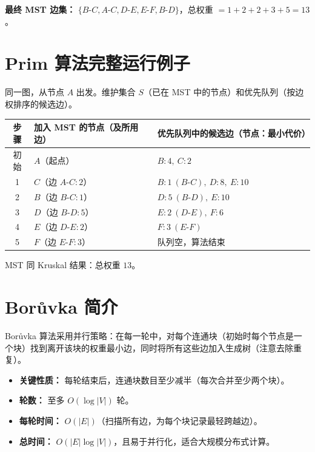 \documentclass[UTF8,openany,12pt]{ctexbook}
\theoremstyle{remark}
\begin{document}
\textbf{最终 MST 边集：} $\{B\text{-}C, A\text{-}C, D\text{-}E, E\text{-}F, B\text{-}D\}$，总权重 $= 1+2+2+3+5 = 13$。

\section{Prim 算法完整运行例子}

同一图，从节点 $A$ 出发。维护集合 $S$（已在 MST 中的节点）和优先队列（按边权排序的候选边）。

\begin{center}
\begin{tabular}{@{}cll@{}}
\toprule
步骤 & 加入 MST 的节点（及所用边） & 优先队列中的候选边（节点：最小代价） \\
\midrule
初始 & $A$（起点） & $B:4,\ C:2$ \\
1    & $C$（边 $A\text{-}C:2$） & $B:1\ (B\text{-}C),\ D:8,\ E:10$ \\
2    & $B$（边 $B\text{-}C:1$） & $D:5\ (B\text{-}D),\ E:10$ \\
3    & $D$（边 $B\text{-}D:5$） & $E:2\ (D\text{-}E),\ F:6$ \\
4    & $E$（边 $D\text{-}E:2$） & $F:3\ (E\text{-}F)$ \\
5    & $F$（边 $E\text{-}F:3$） & 队列空，算法结束 \\
\bottomrule
\end{tabular}
\end{center}

MST 同 Kruskal 结果：总权重 $13$。

\section{Bor\r{u}vka 简介}

Bor\r{u}vka 算法采用并行策略：在每一轮中，对每个连通块（初始时每个节点是一个块）找到离开该块的权重最小边，同时将所有这些边加入生成树（注意去除重复）。

\begin{itemize}
  \item \textbf{关键性质：} 每轮结束后，连通块数目至少减半（每次合并至少两个块）。
  \item \textbf{轮数：} 至多 $O(\log |V|)$ 轮。
  \item \textbf{每轮时间：} $O(|E|)$（扫描所有边，为每个块记录最轻跨越边）。
  \item \textbf{总时间：} $O(|E| \log |V|)$，且易于并行化，适合大规模分布式计算。
\end{itemize}
\end{document}
